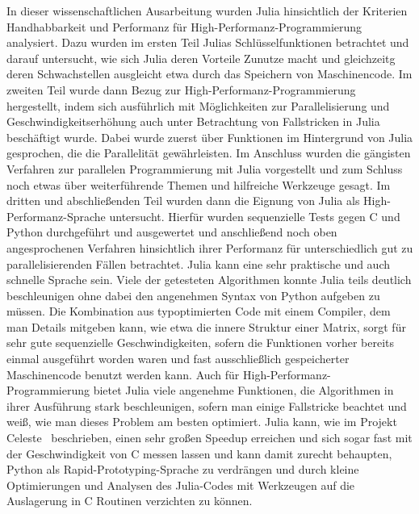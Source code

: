 \documentclass[proseminar,german,utf8]{zihpub}
\begin{document}
In dieser wissenschaftlichen Ausarbeitung wurden Julia hinsichtlich der Kriterien Handhabbarkeit und Performanz für High-Performanz-Programmierung analysiert. Dazu wurden im ersten Teil Julias Schlüsselfunktionen betrachtet und darauf untersucht, wie sich Julia deren Vorteile Zunutze macht und gleichzeitg deren Schwachstellen ausgleicht etwa durch das Speichern von Maschinencode. Im zweiten Teil wurde  dann Bezug zur High-Performanz-Programmierung hergestellt, indem sich ausführlich mit Möglichkeiten zur Parallelisierung und Geschwindigkeitserhöhung auch unter Betrachtung von Fallstricken in Julia beschäftigt wurde. Dabei wurde zuerst über Funktionen im Hintergrund von Julia gesprochen, die die Parallelität gewährleisten. Im Anschluss wurden die gängisten Verfahren zur parallelen Programmierung mit Julia vorgestellt und zum Schluss noch etwas über weiterführende Themen und hilfreiche Werkzeuge gesagt. Im dritten und abschließenden Teil wurden dann die Eignung von Julia als High-Performanz-Sprache untersucht. Hierfür wurden sequenzielle Tests gegen C und Python durchgeführt und ausgewertet und anschließend noch oben angesprochenen Verfahren hinsichtlich ihrer Performanz für unterschiedlich gut zu parallelisierenden Fällen betrachtet. 
Julia kann eine sehr praktische und auch schnelle Sprache sein. Viele der getesteten Algorithmen konnte Julia teils deutlich beschleunigen ohne dabei den angenehmen Syntax von Python aufgeben zu müssen. Die Kombination aus typoptimierten Code mit einem Compiler, dem man Details mitgeben kann, wie etwa die innere Struktur einer Matrix, sorgt für sehr gute sequenzielle Geschwindigkeiten, sofern die Funktionen vorher bereits einmal ausgeführt worden waren und fast ausschließlich gespeicherter Maschinencode benutzt werden kann. Auch für High-Performanz-Programmierung bietet Julia viele angenehme Funktionen, die Algorithmen in ihrer Ausführung stark beschleunigen, sofern man einige Fallstricke beachtet und weiß, wie man dieses Problem am besten optimiert. Julia kann, wie im Projekt Celeste~\cite{CelesteNextPlatform} beschrieben, einen sehr großen Speedup erreichen und sich sogar fast mit der Geschwindigkeit von C messen lassen und kann damit zurecht behaupten, Python als Rapid-Prototyping-Sprache zu verdrängen und durch kleine Optimierungen und Analysen des Julia-Codes mit Werkzeugen auf die Auslagerung in C Routinen verzichten zu können. 
\end{document}
